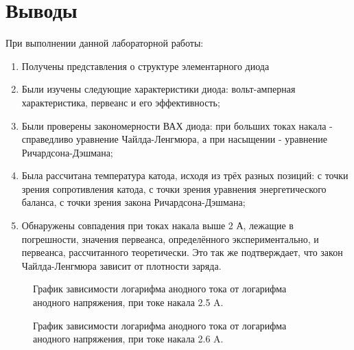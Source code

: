 \documentclass[a4paper, 12pt]{article}
\begin{document}
	\section{Выводы}
	При выполнении данной лабораторной работы:
	\begin{enumerate}
		\item Получены представления о структуре элементарного диода
		\item Были изучены следующие характеристики диода: вольт-амперная характеристика, первеанс и его эффективность;
		\item Были проверены закономерности ВАХ диода: при больших токах накала - справедливо уравнение Чайлда-Ленгмюра, а при насыщении - уравнение Ричардсона-Дэшмана;
		\item Была рассчитана температура катода, исходя из трёх разных позиций: с точки зрения сопротивления катода, с точки зрения уравнения энергетического баланса, с точки зрения закона Ричардсона-Дэшмана;
		\item Обнаружены совпадения при токах накала выше 2 А, лежащие в погрешности, значения первеанса, определённого экспериментально, и первеанса, рассчитанного теоретически. Это так же подтверждает, что закон Чайлда-Ленгмюра зависит от плотности заряда.
	\end{enumerate}
	\newpage
	\begin{figure}[h]
		\caption{График зависимости логарифма анодного тока от логарифма анодного напряжения, при токе накала 2.5 A.}
		\label{graph4}
	\end{figure}

	\begin{figure}[h]
		\caption{График зависимости логарифма анодного тока от логарифма анодного напряжения, при токе накала 2.6 A.}
		\label{graph5}
	\end{figure}
\end{document}
